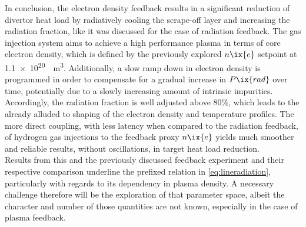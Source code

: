                 In conclusion, the electron density feedback results in a significant reduction of divertor heat load by radiatively cooling the scrape-off layer and increasing the radiation fraction, like it was discussed for the case of radiation feedback. The gas injection system aims to achieve a high performance plasma in terms of core electron density, which is defined by the previously explored $n\ix{e}$ setpoint at \SI{1.1e20}{\per\cubic\meter}. Additionally, a slow ramp down in electron density is programmed in order to compensate for a gradual increase in $P\ix{rad}$ over time, potentially due to a slowly increasing amount of intrinsic impurities. Accordingly, the radiation fraction is well adjusted above 80\%, which leads to the already alluded to shaping of the electron density and temperature profiles. The more direct coupling, with less latency when compared to the radiation feedback, of hydrogen gas injections to the feedback proxy $n\ix{e}$ yields much smoother and reliable results, without oscillations, in target heat load reduction.\\%
                Results from this and the previously discussed feedback experiment and their respective comparison underline the prefixed relation in \cref{eq:lineradiation}, particularly with regards to its dependency in plasma density. A necessary challenge therefore will be the exploration of that parameter space, albeit the character and number of those quantities are not known, especially in the case of plasma feedback.%
%
